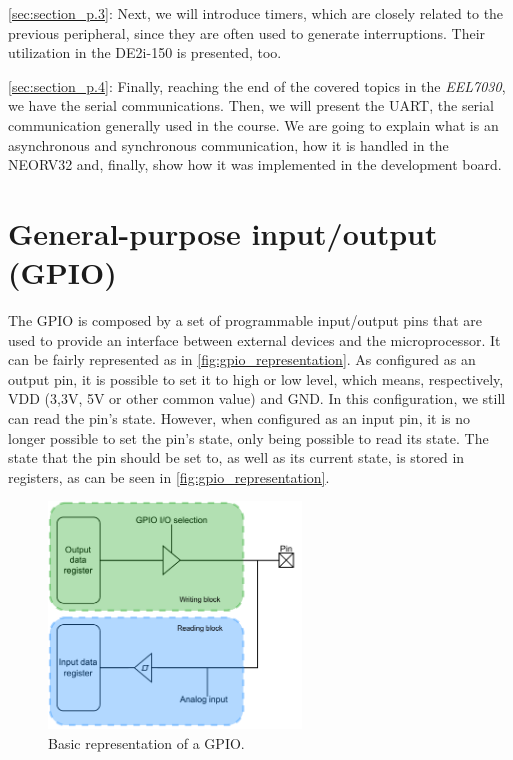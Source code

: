     \autoref{sec:section_p.3}: Next, we will introduce timers, which are closely related to the previous peripheral, since they are often used to generate interruptions. Their utilization in the DE2i-150 is presented, too. 
    
    \autoref{sec:section_p.4}: Finally, reaching the end of the covered topics in the \textit{EEL7030}, we have the serial communications. Then, we will present the UART, the serial communication generally used in the course. We are going to explain what is an asynchronous and synchronous communication, how it is handled in the NEORV32 and, finally, show how it was implemented in the development board.
    
    \section{General-purpose input/output (GPIO)}\label{sec:section_p.1}

        The GPIO is composed by a set of programmable input/output pins that are used to provide an interface between external devices and the microprocessor. It can be fairly represented as in \autoref{fig:gpio_representation}. As configured as an output pin, it is possible to set it to high or low level, which means, respectively, VDD (3,3V, 5V or other common value) and GND. In this configuration, we still can read the pin's state. However, when configured as an input pin, it is no longer possible to set the pin's state, only being possible to read its state. The state that the pin should be set to, as well as its current state, is stored in registers, as can be seen in \autoref{fig:gpio_representation}.

        \begin{figure}[!ht]
            \begin{center}
                \includegraphics[width= 0.6\textwidth]{figures/gpio_representation.pdf}
                \caption{\label{fig:gpio_representation} Basic representation of a GPIO.}
            \end{center}
        \end{figure}


